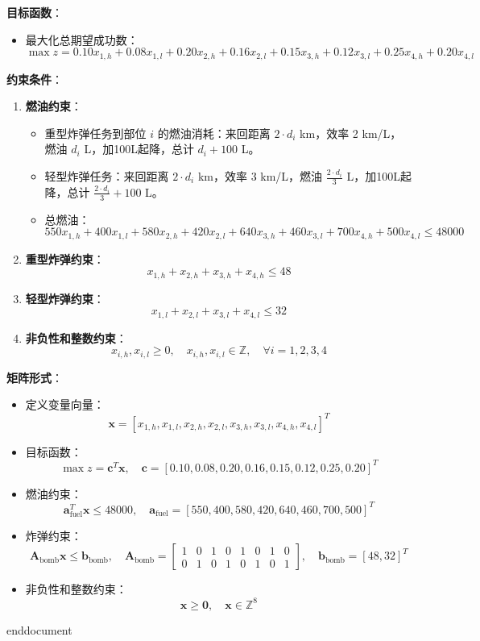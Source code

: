 \textbf{目标函数}：
\begin{itemize}
    \item 最大化总期望成功数：
    \[
    \max z = 0.10 x_{1,h} + 0.08 x_{1,l} + 0.20 x_{2,h} + 0.16 x_{2,l} + 0.15 x_{3,h} + 0.12 x_{3,l} + 0.25 x_{4,h} + 0.20 x_{4,l}
    \]
\end{itemize}

\textbf{约束条件}：
\begin{enumerate}
    \item \textbf{燃油约束}：
        \begin{itemize}
            \item 重型炸弹任务到部位 \( i \) 的燃油消耗：来回距离 \( 2 \cdot d_i \) km，效率 2 km/L，燃油 \( d_i \) L，加100L起降，总计 \( d_i + 100 \) L。
            \item 轻型炸弹任务：来回距离 \( 2 \cdot d_i \) km，效率 3 km/L，燃油 \( \frac{2 \cdot d_i}{3} \) L，加100L起降，总计 \( \frac{2 \cdot d_i}{3} + 100 \) L。
            \item 总燃油：
            \[
            550 x_{1,h} + 400 x_{1,l} + 580 x_{2,h} + 420 x_{2,l} + 640 x_{3,h} + 460 x_{3,l} + 700 x_{4,h} + 500 x_{4,l} \leq 48000
            \]
        \end{itemize}
    \item \textbf{重型炸弹约束}：
        \[
        x_{1,h} + x_{2,h} + x_{3,h} + x_{4,h} \leq 48
        \]
    \item \textbf{轻型炸弹约束}：
        \[
        x_{1,l} + x_{2,l} + x_{3,l} + x_{4,l} \leq 32
        \]
    \item \textbf{非负性和整数约束}：
        \[
        x_{i,h}, x_{i,l} \geq 0, \quad x_{i,h}, x_{i,l} \in \mathbb{Z}, \quad \forall i=1,2,3,4
        \]
\end{enumerate}

\textbf{矩阵形式}：
\begin{itemize}
    \item 定义变量向量：
    \[
    \mathbf{x} = [x_{1,h}, x_{1,l}, x_{2,h}, x_{2,l}, x_{3,h}, x_{3,l}, x_{4,h}, x_{4,l}]^T
    \]
    \item 目标函数：
    \[
    \max z = \mathbf{c}^T \mathbf{x}, \quad \mathbf{c} = [0.10, 0.08, 0.20, 0.16, 0.15, 0.12, 0.25, 0.20]^T
    \]
    \item 燃油约束：
    \[
    \mathbf{a}_{\text{fuel}}^T \mathbf{x} \leq 48000, \quad \mathbf{a}_{\text{fuel}} = [550, 400, 580, 420, 640, 460, 700, 500]^T
    \]
    \item 炸弹约束：
    \[
    \mathbf{A}_{\text{bomb}} \mathbf{x} \leq \mathbf{b}_{\text{bomb}}, \quad \mathbf{A}_{\text{bomb}} = \begin{bmatrix}
    1 & 0 & 1 & 0 & 1 & 0 & 1 & 0 \\
    0 & 1 & 0 & 1 & 0 & 1 & 0 & 1
    \end{bmatrix}, \quad \mathbf{b}_{\text{bomb}} = [48, 32]^T
    \]
    \item 非负性和整数约束：
    \[
    \mathbf{x} \geq \mathbf{0}, \quad \mathbf{x} \in \mathbb{Z}^8
    \]
\end{itemize}


\ifx\allfiles\undefined
	
	
	
	end{document}
	\else
	\fi